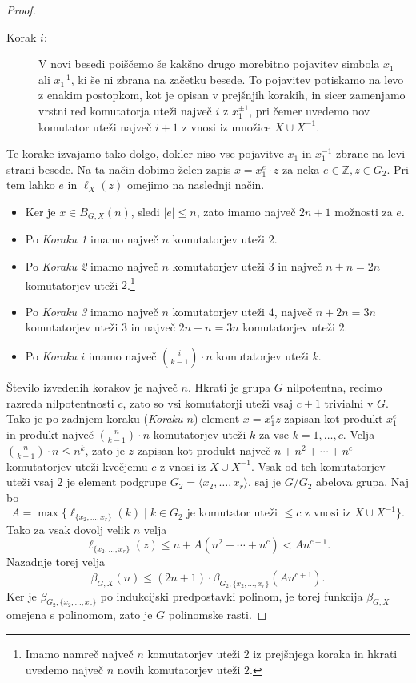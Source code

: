 \documentclass[11pt]{book}
\def\ZZ{\mathbb{Z}}
\theoremstyle{definition}
\theoremstyle{zgled}
\theoremstyle{odprtproblem}
\theoremstyle{domacanaloga}
\newenvironment{dokaz}
    {\color{siva}\begin{proof}}
    {\end{proof}}
\theoremstyle{izrek}
\begin{document}
\begin{dokaz}
\begin{description}
    \item[Korak $i$:] V novi besedi poiščemo še kakšno drugo morebitno pojavitev simbola $x_1$ ali $x_1^{-1}$, ki še ni zbrana na začetku besede. To pojavitev potiskamo na levo z enakim postopkom, kot je opisan v prejšnjih korakih, in sicer zamenjamo vrstni red komutatorja uteži največ $i$ z $x_1^{\pm 1}$, pri čemer uvedemo nov komutator uteži največ $i+1$ z vnosi iz množice $X \cup X^{-1}$.
\end{description}

Te korake izvajamo tako dolgo, dokler niso vse pojavitve $x_1$ in $x_1^{-1}$ zbrane na levi strani besede. Na ta način dobimo želen zapis $x = x_1^e \cdot z$ za neka $e \in \ZZ, z \in G_2$. Pri tem lahko $e$ in $\ell_X(z)$ omejimo na naslednji način.

\begin{itemize}
    \item Ker je $x \in B_{G,X}(n)$, sledi $|e| \leq n$, zato imamo največ $2n+1$ možnosti za $e$.

    \item Po {\em Koraku 1} imamo največ $n$ komutatorjev uteži $2$.
    \item Po {\em Koraku 2} imamo največ $n$ komutatorjev uteži $3$ in največ $n+n = 2n$ komutatorjev uteži $2$.\footnote{Imamo namreč največ $n$ komutatorjev uteži $2$ iz prejšnjega koraka in hkrati uvedemo največ $n$ novih komutatorjev uteži $2$.} 
    \item Po {\em Koraku 3} imamo največ $n$ komutatorjev uteži $4$, največ $n + 2n = 3n$ komutatorjev uteži $3$ in največ $2n + n = 3n$ komutatorjev uteži $2$.
    \item Po {\em Koraku $i$} imamo največ $\binom{i}{k-1} \cdot n$ komutatorjev uteži $k$.
\end{itemize}

Število izvedenih korakov je največ $n$. Hkrati je grupa $G$ nilpotentna, recimo razreda nilpotentnosti $c$, zato so vsi komutatorji uteži vsaj $c+1$ trivialni v $G$. Tako je po zadnjem koraku ({\em Koraku $n$}) element $x = x_1^e z$ zapisan kot produkt $x_1^e$ in produkt največ $\binom{n}{k-1} \cdot n$ komutatorjev uteži $k$ za vse $k = 1, \dots, c$. Velja $\binom{n}{k-1} \cdot n \leq n^k$, zato je $z$ zapisan kot produkt največ $n + n^2 + \cdots + n^c$ komutatorjev uteži kvečjemu $c$ z vnosi iz $X \cup X^{-1}$. Vsak od teh komutatorjev uteži vsaj $2$ je element podgrupe $G_2 = \langle x_2, \dots, x_r \rangle$, saj je $G/G_2$ abelova grupa. Naj bo
\[
A = \max \{ \ell_{\{ x_2, \dots, x_r \}}(k) \mid \text{$k \in G_2$ je komutator uteži $\leq c$ z vnosi iz $X \cup X^{-1}$}\}.
\]
Tako za vsak dovolj velik $n$ velja
\[
\ell_{\{ x_2, \dots, x_r \}}(z) \leq n + A(n^2 + \cdots + n^c) < A n^{c+1}.
\]
Nazadnje torej velja
\[
\beta_{G,X}(n) \leq (2n+1) \cdot \beta_{G_2, \{ x_2, \dots, x_r \}}(A n^{c+1}).
\]
Ker je $\beta_{G_2, \{ x_2, \dots, x_r \}}$ po indukcijski predpostavki polinom, je torej funkcija $\beta_{G,X}$ omejena s polinomom, zato je $G$ polinomske rasti.
\end{dokaz}
\end{document}
